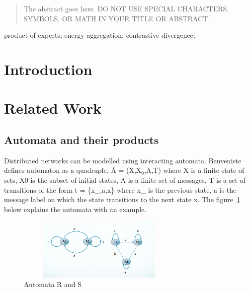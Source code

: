 \documentclass[10pt, conference, compsocconf]{IEEEtran}
\begin{document}
\begin{abstract}
The abstract goes here. DO NOT USE SPECIAL CHARACTERS, SYMBOLS, OR MATH IN YOUR TITLE OR ABSTRACT.

\end{abstract}

\begin{IEEEkeywords}
product of experts; energy aggregation; contrastive divergence;

\end{IEEEkeywords}


%
\IEEEpeerreviewmaketitle



\section{Introduction}


\section{Related Work}
\subsection{Automata and their products}
\label{sec:related}

Distributed networks can be modelled using interacting automata. Benveniste defines automaton as a quadruple, \'{A} = (X,X$_{0}$,A,T) where X is a finite state of sets, X0 is the subset of initial states, A is a finite set of messages, T is a set of transitions of the form t = \{x\_,a,x\} where x\_ is the previous state, a is the message label on which the state transitions to the next state x. The figure~\ref{fig:ex} below explains the automata with an example.\\

\begin{figure}[t]
\centering
\includegraphics[width=8cm,height=3cm]{automata.png}
\caption{Automata R and S}
\label{fig:ex}
\end{figure}
\end{document}
